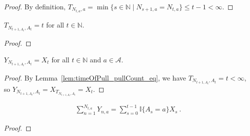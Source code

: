 \begin{proof}\leanok
By definition, $T_{N_{t,a}, a} = \min\{s \in \mathbb{N} \mid N_{s+1,a} = N_{t,a}\} \le t - 1 < \infty$.
\end{proof}


\begin{lemma}\label{lem:timeOfPull_pullCount_eq}
  \leanok
$T_{N_{t+1, A_t}, A_t} = t$ for all $t \in \mathbb{N}$.
\end{lemma}

\begin{proof}\leanok

\end{proof}


\begin{lemma}\label{lem:altReward_pullCount}
  \leanok
$Y_{N_{t+1, A_t}, A_t} = X_t$ for all $t \in \mathbb{N}$ and $a \in \mathcal{A}$.
\end{lemma}

\begin{proof}\leanok
By Lemma~\ref{lem:timeOfPull_pullCount_eq}, we have $T_{N_{t+1,A_t}, A_t} = t < \infty$, so $Y_{N_{t+1,A_t}, A_t} = X_{T_{N_{t+1,A_t}, A_t}} = X_t$.

\end{proof}


\begin{lemma}\label{lem:sum_altReward}
  \leanok
\begin{align*}
  \sum_{n=1}^{N_{t, a}} Y_{n, a} = \sum_{s=0}^{t-1} \mathbb{I}\{A_s = a\} X_s
  \: .
\end{align*}
\end{lemma}

\begin{proof}\leanok

\end{proof}
